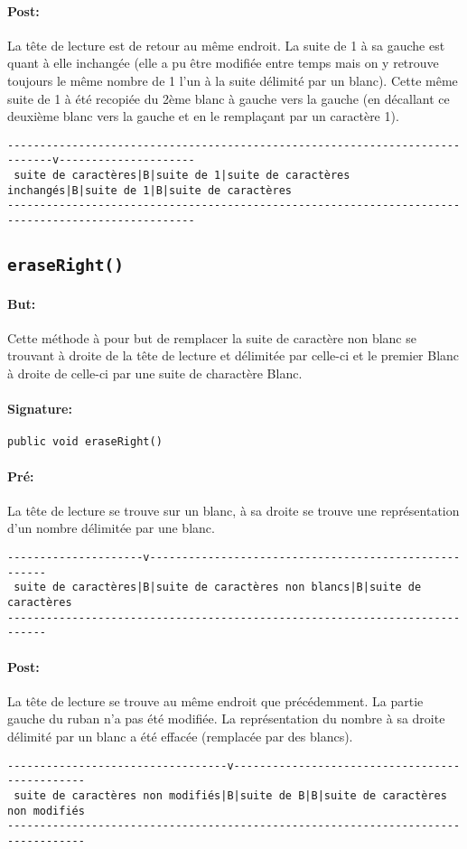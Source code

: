 \documentclass[a4paper,11pt]{article}
\begin{document}
\paragraph{Post:} La tête de lecture est de retour au même endroit. La suite de 1 à sa gauche est quant à elle inchangée (elle a pu être modifiée entre temps mais on y retrouve toujours le même nombre de 1 l'un à la suite délimité par un blanc). Cette même suite de 1 à été recopiée du 2ème blanc à gauche vers la gauche (en décallant ce deuxième blanc vers la gauche et en le remplaçant par un caractère 1). 
\begin{footnotesize}
\begin{verbatim}
-----------------------------------------------------------------------------v---------------------
 suite de caractères|B|suite de 1|suite de caractères inchangés|B|suite de 1|B|suite de caractères
---------------------------------------------------------------------------------------------------
\end{verbatim}
\end{footnotesize}
\subsection{\texttt{eraseRight()}}
\paragraph{But:} Cette méthode à pour but de remplacer la suite de caractère non blanc se trouvant à droite de la tête de lecture et délimitée par celle-ci et le premier Blanc à droite de celle-ci par une suite de charactère Blanc.
\paragraph{Signature:} \texttt{public void eraseRight()}
\paragraph{Pré:}
La tête de lecture se trouve sur un blanc, à sa droite se trouve une représentation d'un nombre délimitée par une blanc.
\begin{verbatim}
---------------------v------------------------------------------------------
 suite de caractères|B|suite de caractères non blancs|B|suite de caractères
----------------------------------------------------------------------------
\end{verbatim}
\paragraph{Post:} 
La tête de lecture se trouve au même endroit que précédemment. La partie gauche du ruban n'a pas été modifiée. La représentation du nombre à sa droite délimité par un blanc a été effacée (remplacée par des blancs).
\begin{verbatim}
----------------------------------v-----------------------------------------------
 suite de caractères non modifiés|B|suite de B|B|suite de caractères non modifiés
----------------------------------------------------------------------------------
\end{verbatim}
\end{document}
